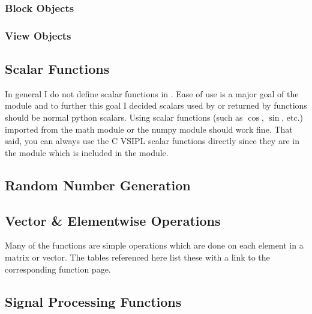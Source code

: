 \subsubsection*{Block Objects}
\subsubsection*{View Objects}
\subsection*{Scalar Functions}
In general I do not define scalar functions in \pyjv.  Ease of use is a major goal of the \pyjv module and to further this goal I decided scalars used by or returned by \pyjv functions should be normal python scalars. Using scalar functions (such as $\cos$, $\sin$, etc.) imported from the math module or the numpy module should work fine. That said, you can always use the C VSIPL scalar functions directly since they are in the  module which is included in the \pyjv module.
\subsection*{Random Number Generation}
\subsection*{Vector \& Elementwise Operations}
Many of the functions are simple operations which are done on each element in a matrix or vector. The tables referenced here list these with a link to the corresponding function page.
    
    
    
    
    
    
    
    
    
    
\subsection*{Signal Processing Functions}
    
